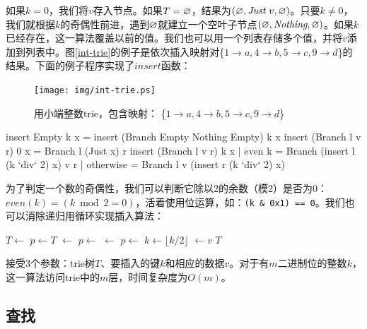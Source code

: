 \documentclass[b5paper]{ctexart}
\begin{document}
如果$k = 0$，我们将$v$存入节点。如果$T = \varnothing$，结果为$(\varnothing, \textit{Just}\ v, \varnothing)$。只要$k \neq 0$，我们就根据$k$的奇偶性前进，遇到$\varnothing$就建立一个空叶子节点$(\varnothing, \textit{Nothing}, \varnothing)$。如果$k$已经存在，这一算法覆盖以前的值。我们也可以用一个列表存储多个值，并将$v$添加到列表中。图\ref{int-trie}的例子是依次插入映射对\{$ 1 \rightarrow a, 4 \rightarrow b, 5 \rightarrow c, 9 \rightarrow d$\}的结果。下面的例子程序实现了$insert$函数：

\begin{figure}[htbp]
  \centering
  \texttt{[image: img/int-trie.ps]}
  \caption{用小端整数trie，包含映射：
          \{$ 1 \rightarrow a, 4 \rightarrow b, 5 \rightarrow c, 9 \rightarrow d$\}}
  \label{fig:int-trie}
\end{figure}

\begin{Haskell}
insert Empty k x = insert (Branch Empty Nothing Empty) k x
insert (Branch l v r) 0 x = Branch l (Just x) r
insert (Branch l v r) k x | even k    = Branch (insert l (k `div` 2) x) v r
                          | otherwise = Branch l v (insert r (k `div` 2) x)
\end{Haskell}

为了判定一个数的奇偶性，我们可以判断它除以2的余数（模2）是否为0：$even(k) = (k \bmod 2 = 0)$，活着使用位运算，如：\texttt{(k \& 0x1) == 0}。我们也可以消除递归用循环实现插入算法：

\begin{algorithmic}[1]
    \State $T \gets$   
  \EndIf
  \State $p \gets T$
        \State {} $\gets$ 
      \EndIf
      \State $p \gets$ 
    \Else
        \State {} $\gets$ 
      \EndIf
      \State $p \gets$ 
    \EndIf
    \State $k \gets \lfloor k/2 \rfloor$
  \EndWhile
  \State {} $\gets v$
  \State \Return $T$
\EndFunction
\end{algorithmic}

接受3个参数：trie树$T$、要插入的键$k$和相应的数据$v$。对于有$m$二进制位的整数$k$，这一算法访问trie中的$m$层，时间复杂度为$O(m)$。

\subsection{查找}
\end{document}
